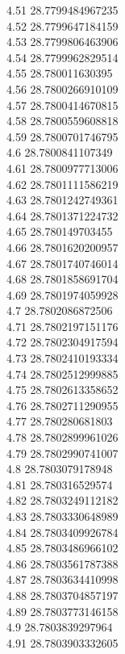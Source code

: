 {4.51	28.7799484967235\\
4.52	28.7799647184159\\
4.53	28.7799806463906\\
4.54	28.7799962829514\\
4.55	28.780011630395\\
4.56	28.7800266910109\\
4.57	28.7800414670815\\
4.58	28.7800559608818\\
4.59	28.7800701746795\\
4.6	28.7800841107349\\
4.61	28.7800977713006\\
4.62	28.7801111586219\\
4.63	28.7801242749361\\
4.64	28.7801371224732\\
4.65	28.780149703455\\
4.66	28.7801620200957\\
4.67	28.7801740746014\\
4.68	28.7801858691704\\
4.69	28.7801974059928\\
4.7	28.7802086872506\\
4.71	28.7802197151176\\
4.72	28.7802304917594\\
4.73	28.7802410193334\\
4.74	28.7802512999885\\
4.75	28.7802613358652\\
4.76	28.7802711290955\\
4.77	28.780280681803\\
4.78	28.7802899961026\\
4.79	28.7802990741007\\
4.8	28.7803079178948\\
4.81	28.780316529574\\
4.82	28.7803249112182\\
4.83	28.7803330648989\\
4.84	28.7803409926784\\
4.85	28.7803486966102\\
4.86	28.7803561787388\\
4.87	28.7803634410998\\
4.88	28.7803704857197\\
4.89	28.7803773146158\\
4.9	28.7803839297964\\
4.91	28.7803903332605\\
}
